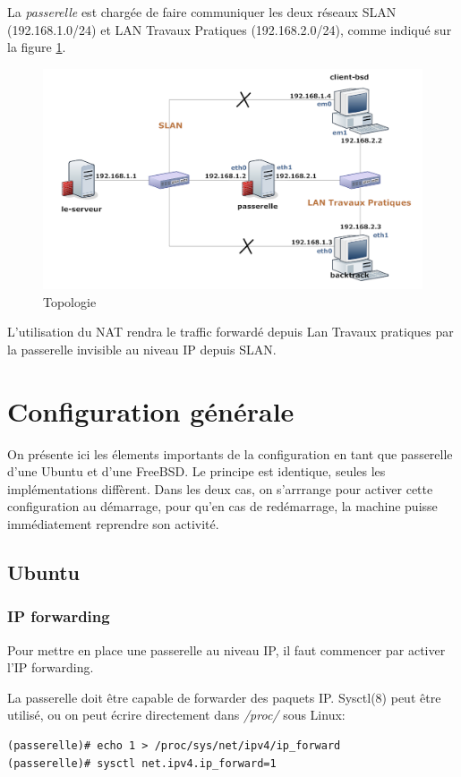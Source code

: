 \documentclass[a4paper]{article}
\begin{document}

La \textit{passerelle} est chargée de faire communiquer les deux réseaux
SLAN (192.168.1.0/24) et LAN Travaux Pratiques (192.168.2.0/24), comme indiqué
sur la figure \ref{topo}.
\begin{figure}[!ht]
	\centering
	\includegraphics[scale=.6]{Topologie.PNG}
	\caption{\label{topo} Topologie}
\end{figure}
L'utilisation du NAT rendra le traffic forwardé depuis Lan Travaux pratiques
par la passerelle invisible au niveau IP depuis SLAN.

\section{Configuration générale}
On présente ici les élements importants de la configuration en
tant que passerelle d'une Ubuntu et d'une FreeBSD. Le principe
est identique, seules les implémentations diffèrent. Dans les
deux cas, on s'arrrange pour activer cette configuration au
démarrage, pour qu'en cas de redémarrage, la machine puisse
immédiatement reprendre son activité.

\subsection{Ubuntu}
\subsubsection{IP forwarding}
Pour mettre en place une passerelle au niveau IP, il faut commencer
par activer l'IP forwarding.

La passerelle doit être capable de forwarder des paquets IP. Sysctl(8)
peut être utilisé, ou on peut écrire directement dans \textit{/proc/} sous
Linux:
\begin{verbatim}
(passerelle)# echo 1 > /proc/sys/net/ipv4/ip_forward
(passerelle)# sysctl net.ipv4.ip_forward=1
\end{verbatim}
\end{document}
